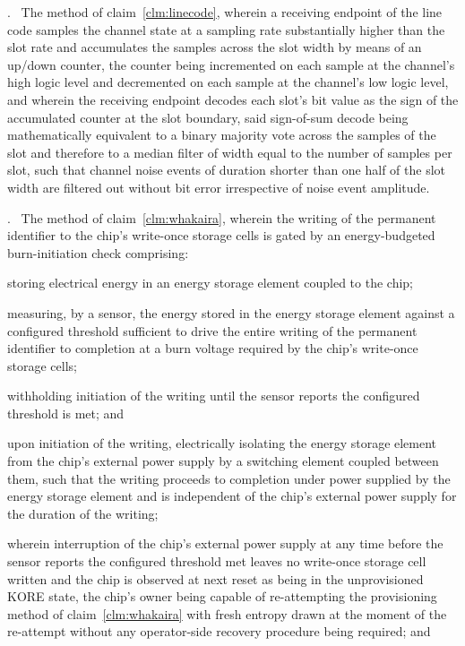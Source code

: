 \documentclass[12pt,letterpaper]{article}
\newcounter{claim}
\newcommand{\claim}[1]{\medskip\par\refstepcounter{claim}\noindent\arabic{claim}.~\label{clm:#1}\ignorespaces}
\newcommand{\clm}[1]{claim~\ref{clm:#1}}
\newcounter{fig}
\begin{document}
\claim{majoritysample} The method of \clm{linecode}, wherein a receiving endpoint of the line code samples the channel state at a sampling rate substantially higher than the slot rate and accumulates the samples across the slot width by means of an up/down counter, the counter being incremented on each sample at the channel's high logic level and decremented on each sample at the channel's low logic level, and wherein the receiving endpoint decodes each slot's bit value as the sign of the accumulated counter at the slot boundary, said sign-of-sum decode being mathematically equivalent to a binary majority vote across the samples of the slot and therefore to a median filter of width equal to the number of samples per slot, such that channel noise events of duration shorter than one half of the slot width are filtered out without bit error irrespective of noise event amplitude.

\claim{energygate} The method of \clm{whakaira}, wherein the writing of the permanent identifier to the chip's write-once storage cells is gated by an energy-budgeted burn-initiation check comprising:

storing electrical energy in an energy storage element coupled to the chip;

measuring, by a sensor, the energy stored in the energy storage element against a configured threshold sufficient to drive the entire writing of the permanent identifier to completion at a burn voltage required by the chip's write-once storage cells;

withholding initiation of the writing until the sensor reports the configured threshold is met; and

upon initiation of the writing, electrically isolating the energy storage element from the chip's external power supply by a switching element coupled between them, such that the writing proceeds to completion under power supplied by the energy storage element and is independent of the chip's external power supply for the duration of the writing;

wherein interruption of the chip's external power supply at any time before the sensor reports the configured threshold met leaves no write-once storage cell written and the chip is observed at next reset as being in the unprovisioned KORE state, the chip's owner being capable of re-attempting the provisioning method of \clm{whakaira} with fresh entropy drawn at the moment of the re-attempt without any operator-side recovery procedure being required; and
\end{document}
